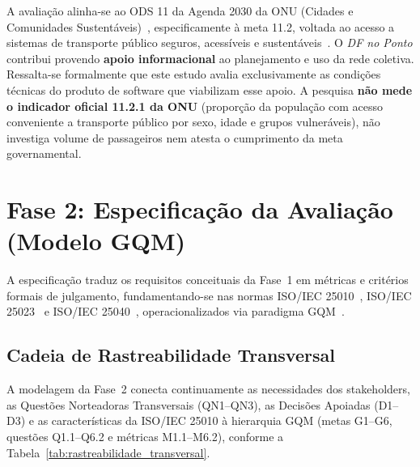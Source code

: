 \documentclass[11pt,a4paper]{article}
\begin{document}
A avaliação alinha-se ao ODS 11 da Agenda 2030 da ONU (Cidades e Comunidades Sustentáveis)~\cite{onu2015}, especificamente à meta 11.2, voltada ao acesso a sistemas de transporte público seguros, acessíveis e sustentáveis~\cite{ipeaods11}. O \textit{DF no Ponto} contribui provendo \textbf{apoio informacional} ao planejamento e uso da rede coletiva. Ressalta-se formalmente que este estudo avalia exclusivamente as condições técnicas do produto de software que viabilizam esse apoio. A pesquisa \textbf{não mede o indicador oficial 11.2.1 da ONU} (proporção da população com acesso conveniente a transporte público por sexo, idade e grupos vulneráveis), não investiga volume de passageiros nem atesta o cumprimento da meta governamental.

\section{Fase 2: Especificação da Avaliação (Modelo GQM)}
\label{sec:fase2}

A especificação traduz os requisitos conceituais da Fase~1 em métricas e critérios formais de julgamento, fundamentando-se nas normas ISO/IEC 25010~\cite{iso25010}, ISO/IEC 25023~\cite{iso25023} e ISO/IEC 25040~\cite{iso25040}, operacionalizados via paradigma GQM~\cite{basili1988,basili1994}.

\subsection{Cadeia de Rastreabilidade Transversal}
\label{sec:transicao_rastreabilidade}

A modelagem da Fase~2 conecta continuamente as necessidades dos stakeholders, as Questões Norteadoras Transversais (QN1--QN3), as Decisões Apoiadas (D1--D3) e as características da ISO/IEC 25010 à hierarquia GQM (metas G1--G6, questões Q1.1--Q6.2 e métricas M1.1--M6.2), conforme a Tabela~\ref{tab:rastreabilidade_transversal}.
\end{document}
